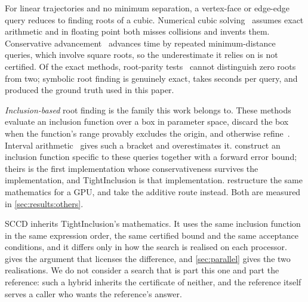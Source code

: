 For linear trajectories and no minimum separation, a vertex-face or edge-edge
query reduces to finding roots of a cubic. Numerical cubic
solving~\citep{provot1997collision,bridson2002robust} assumes exact arithmetic
and in floating point both misses collisions and invents them. Conservative
advancement~\citep{mirtich1996impulse,tang2010local,lan2022penetration} advances
time by repeated minimum-distance queries, which involve square roots, so the
underestimate it relies on is not certified. Of the exact methods, root-parity
tests~\citep{brochu2012efficient,tang2014bernstein,wang2022rootparity} cannot
distinguish zero roots from two; symbolic root finding is genuinely exact, takes
seconds per query, and produced the ground truth used in this paper.

\emph{Inclusion-based} root finding is the family this work belongs to. These
methods evaluate an inclusion function over a box in parameter space, discard
the box when the function's range provably excludes the origin, and otherwise
refine~\citep{snyder1992interval,snyder1993interval,vonherzen1990geometric}.
Interval arithmetic~\citep{moore2009interval} gives such a bracket and
overestimates it. \citet{wang2021tight} construct an inclusion function specific
to these queries together with a forward error bound; theirs is the first
implementation whose conservativeness survives the implementation, and
TightInclusion is that implementation. \citet{belgrod2025toi} restructure the
same mathematics for a GPU, and \citet{li2021codim} take the additive route
instead. Both are measured in \cref{sec:results:others}.

SCCD inherits TightInclusion's mathematics. It uses the same inclusion function
in the same expression order, the same certified bound and the same acceptance
conditions, and it differs only in how the search is realised on each processor.
 gives the argument that licenses the difference, and
\cref{sec:parallel} gives the two realisations. We do not consider a search that
is part this one and part the reference: such a hybrid inherits the certificate
of neither, and the reference itself serves a caller who wants the reference's
answer.
